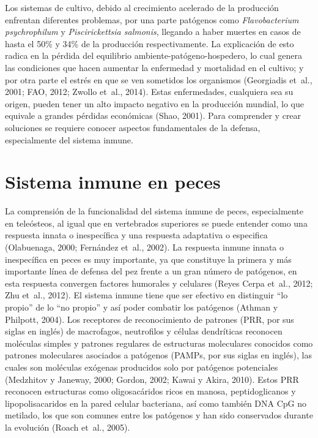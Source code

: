 \documentclass[12pt,letterpaper,oneside]{scrbook}
\begin{document}
Los sistemas de cultivo, debido al crecimiento acelerado de la
producción enfrentan diferentes problemas, por una parte patógenos como
\emph{Flavobacterium psychrophilum} y \emph{Piscirickettsia salmonis},
llegando a haber muertes en casos de hasta el 50\% y 34\% de la
producción respectivamente. La explicación de esto radica en la pérdida
del equilibrio ambiente-patógeno-hospedero, lo cual genera las
condiciones que hacen aumentar la enfermedad y mortalidad en el cultivo;
y por otra parte el estrés en que se ven sometidos los organismos
(Georgiadis et~al., 2001; FAO, 2012; Zwollo et~al., 2014). Estas
enfermedades, cualquiera sea su origen, pueden tener un alto impacto
negativo en la producción mundial, lo que equivale a grandes pérdidas
económicas (Shao, 2001). Para comprender y crear soluciones se requiere
conocer aspectos fundamentales de la defensa, especialmente del sistema
inmune.

\section{Sistema inmune en peces}

La comprensión de la funcionalidad del sistema inmune de peces,
especialmente en teleósteos, al igual que en vertebrados superiores se
puede entender como una respuesta innata o inespecífica y una respuesta
adaptativa o especifica (Olabuenaga, 2000; Fernández et~al., 2002). La
respuesta inmune innata o inespecífica en peces es muy importante, ya
que constituye la primera y más importante línea de defensa del pez
frente a un gran número de patógenos, en esta respuesta convergen
factores humorales y celulares ({Reyes Cerpa} et~al., 2012; Zhu et~al.,
2012). El sistema inmune tiene que ser efectivo en distinguir ``lo
propio'' de lo ``no propio'' y así poder combatir los patógenos (Athman
y Philpott, 2004). Los receptores de reconocimiento de patrones (PRR,
por sus siglas en inglés) de macrofagos, neutrofilos y células
dendríticas reconocen moléculas simples y patrones regulares de
estructuras moleculares conocidos como patrones moleculares asociados a
patógenos (PAMPs, por sus siglas en inglés), las cuales son moléculas
exógenas producidos solo por patógenos potenciales (Medzhitov y Janeway,
2000; Gordon, 2002; Kawai y Akira, 2010). Estos PRR reconocen
estructuras como oligosacáridos ricos en manosa, peptidoglicanos y
lipopolisacaridos en la pared celular bacteriana, así como también DNA
CpG no metilado, los que son comunes entre los patógenos y han sido
conservados durante la evolución (Roach et~al., 2005).
\end{document}
